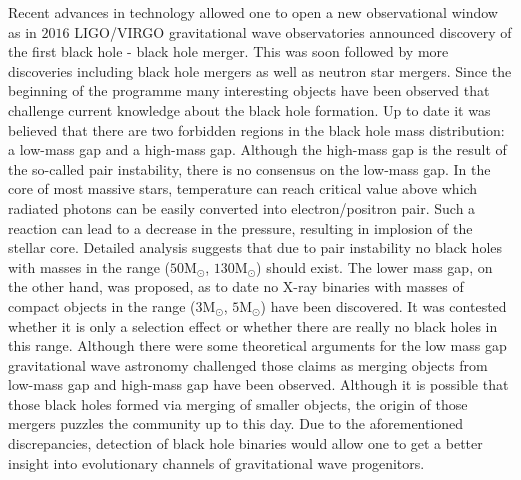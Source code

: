 \documentclass{pracalicmgr}
\begin{document}
Recent advances in technology allowed one to open a new observational window as in $2016$ LIGO/VIRGO gravitational wave observatories
announced discovery of the first black hole - black hole merger. This was soon followed by more discoveries including black hole mergers as
well as neutron star mergers. Since the beginning of the programme many interesting objects have been observed that challenge current knowledge
about the black hole formation. Up to date it was believed that there are two forbidden regions in the black hole mass distribution: a
low-mass gap and a high-mass gap. Although the high-mass gap is the result of the so-called pair instability, there is no consensus on the low-mass gap.
In the core of most massive stars, temperature can reach critical value above which radiated photons can be easily converted into electron/positron pair. Such a
reaction can lead to a decrease in the pressure, resulting in implosion of the stellar core. Detailed analysis suggests that due to pair instability 
no black holes with masses in the range ($50 \textrm{M}_{\odot}$, $130 \textrm{M}_{\odot}$) should exist.
The lower mass gap, on the other hand, was proposed, as to date no X-ray binaries with masses of compact objects in the range ($3 \textrm{M}_{\odot}$, $5 \textrm{M}_{\odot}$)
have been discovered. It was contested whether it is only a
selection effect or whether there are really no black holes in this range. Although there were some theoretical arguments for the low mass gap \citep{belczynski_missing_2012}
gravitational wave astronomy challenged those claims as merging objects from low-mass gap and high-mass gap have been observed. Although
it is possible that those black holes formed via merging of smaller objects, the origin of those mergers puzzles the community up to this day. 
Due to the aforementioned discrepancies, detection of black hole binaries would allow one to get a better insight into evolutionary channels
of gravitational wave progenitors. 
\end{document}
